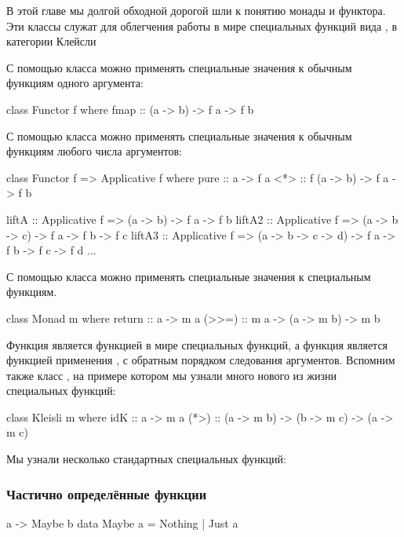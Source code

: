 В этой главе мы долгой обходной дорогой шли к понятию монады и функтора.
Эти классы служат для облегчения работы в мире специальных функций вида
, в категории Клейсли

С помощью класса  можно применять специальные значения к
обычным функциям одного аргумента:


\begin{code}
class Functor f where
    fmap :: (a -> b) -> f a -> f b
\end{code}

С помощью класса  можно применять специальные значения к
обычным функциям любого числа аргументов:


\begin{code}
class Functor f => Applicative f where
    pure    :: a -> f a
    <*>     :: f (a -> b) -> f a -> f b

liftA  :: Applicative f => (a -> b) -> f a -> f b
liftA2 :: Applicative f => (a -> b -> c) -> f a -> f b -> f c
liftA3 :: Applicative f => (a -> b -> c -> d) -> f a -> f b -> f c -> f d
...
\end{code}

С помощью класса  можно применять специальные значения к
специальным функциям.


\begin{code}
class Monad m where
    return  :: a -> m a
    (>>=)   :: m a -> (a -> m b) -> m b
\end{code}

Функция  является функцией  в мире специальных
функций, а функция \In{>>=} является функцией применения \In{($)}, с
обратным порядком следования аргументов. Вспомним также класс
, на примере котором мы узнали много нового из жизни
специальных функций:


\begin{code}
class Kleisli m where
    idK     :: a -> m a
    (*>)    :: (a -> m b) -> (b -> m c) -> (a -> m c)
\end{code}

Мы узнали несколько стандартных специальных функций:

\subsubsection{Частично определённые функции}


\begin{code}
a -> Maybe b
data Maybe a = Nothing | Just a
\end{code}

